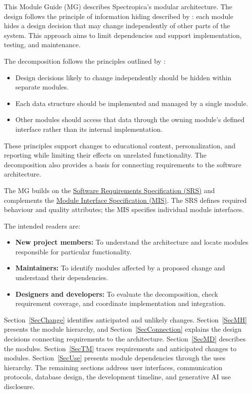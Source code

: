 \documentclass[12pt, titlepage]{article}
\begin{document}
This Module Guide (MG) describes Spectropica's modular architecture. The
design follows the principle of information hiding described by
\citet{Parnas1972a}: each module hides a design decision that may change
independently of other parts of the system. This approach aims to limit
dependencies and support implementation, testing, and maintenance.

The decomposition follows the principles outlined by
\citet{ParnasEtAl1984}:
\begin{itemize}
  \item Design decisions likely to change independently should be
    hidden within separate modules.
  \item Each data structure should be implemented and managed by a
    single module.
  \item Other modules should access that data through the owning
    module's defined interface rather than its internal implementation.
\end{itemize}

These principles support changes to educational content, personalization,
and reporting while limiting their effects on unrelated functionality.
The decomposition also provides a basis for connecting requirements to
the software architecture.

The MG builds on the
\href{https://github.com/meena-alomran/game-n-grow/blob/main/pdfs/SRS-IEEE/SRS.pdf}
  {Software Requirements Specification (SRS)} and complements the
\href{https://github.com/meena-alomran/game-n-grow/blob/main/pdfs/Design/SoftDetailedDes/MIS.pdf}
  {Module Interface Specification (MIS)}. The SRS defines required behaviour
and quality attributes; the MIS specifies individual module interfaces.

The intended readers are:
\begin{itemize}
  \item \textbf{New project members:} To understand the architecture
    and locate modules responsible for particular functionality.
  \item \textbf{Maintainers:} To identify modules affected by a
    proposed change and understand their dependencies.
  \item \textbf{Designers and developers:} To evaluate the
    decomposition, check requirement coverage, and coordinate
    implementation and integration.
\end{itemize}

Section~\ref{SecChange} identifies anticipated and unlikely changes.
Section~\ref{SecMH} presents the module hierarchy, and
Section~\ref{SecConnection} explains the design decisions connecting
requirements to the architecture. Section~\ref{SecMD} describes the
modules. Section~\ref{SecTM} traces requirements and anticipated changes
to modules. Section~\ref{SecUse} presents module dependencies through
the uses hierarchy. The remaining sections address user interfaces,
communication protocols, database design, the development timeline,
and generative AI use disclosure.
\end{document}
